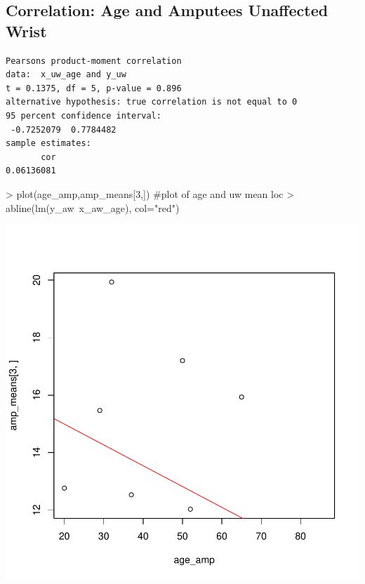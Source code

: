 \documentclass{article}
\begin{document}
\subsection*{Correlation: Age and Amputees Unaffected Wrist}
\begin{verbatim}
Pearsons product-moment correlation
data:  x_uw_age and y_uw
t = 0.1375, df = 5, p-value = 0.896
alternative hypothesis: true correlation is not equal to 0
95 percent confidence interval:
 -0.7252079  0.7784482
sample estimates:
       cor 
0.06136081 
\end{verbatim}
\begin{Schunk}
\begin{Sinput}
> plot(age_amp,amp_means[3,]) #plot of age and uw mean loc
> abline(lm(y_aw~x_aw_age), col="red")
\end{Sinput}
\end{Schunk}
\includegraphics{15_3_20_Loc_results-006}

\newpage
\end{document}
